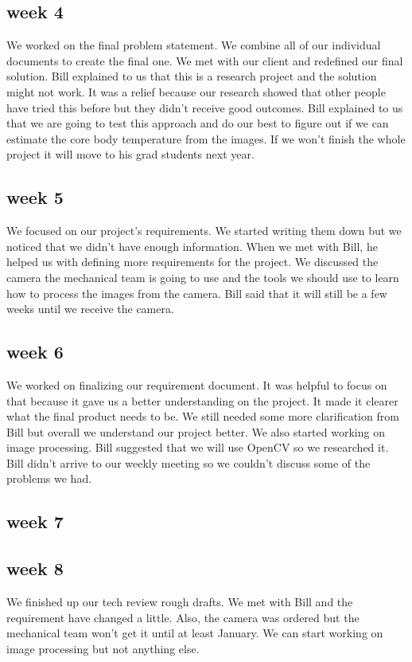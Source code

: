 \documentclass[onecolumn, draftclsnofoot,10pt, compsoc]{IEEEtran}
\begin{document}
\subsection{week 4}
We worked on the final problem statement. We combine all of our individual documents to create the final one. We met with our client and  redefined our final solution. Bill explained to us that this is a research project and the solution might not work. It was a relief because our research showed that other people have tried this before but they didn’t receive good outcomes\cite{OtherResearch}. Bill explained to us that  we are going to test this approach and do our best to figure out if we can estimate the core body temperature from the images. If we won’t finish the whole project it will move to his grad students next year. 

\subsection{week 5}
We focused on our project's requirements. We started writing them down but we noticed that we didn’t have enough information. When we met with Bill, he helped us with defining more requirements for the project. We discussed the camera the mechanical team is going to use and the tools we should use to learn how to process the images from the camera. Bill said that it will still be a few weeks until we receive the camera. 

\subsection{week 6}
We worked on finalizing our requirement  document. It was helpful to focus on that because it gave us a better understanding on the project. It made it clearer what the final product needs to be. We still needed some more clarification from Bill  but overall we understand our project better. We also started working on image processing. Bill suggested that we will use OpenCV so we researched it. Bill didn’t arrive to our weekly meeting so we couldn’t discuss some of the problems we had. 
\subsection{week 7}
\subsection{week 8}
We finished up our tech review rough drafts. We met with Bill and the requirement have changed a little. Also, the camera was ordered but the mechanical team won't get it until at least January. We can start working on image processing but not anything else.
\end{document}
